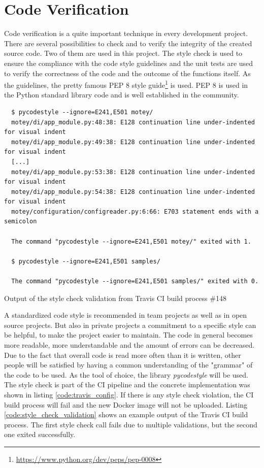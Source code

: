 \section{Code Verification}
\label{section:code-verification}
Code verification is a quite important technique in every development project.
There are several possibilities to check and to verify the integrity of the created source code.
Two of them are used in this project.
The style check is used to ensure the compliance with the code style guidelines and the unit tests are used to verify the correctness of the code and the outcome of the functions itself.
As the guidelines, the pretty famous \ac{PEP} 8 style guide\footnote{\url{https://www.python.org/dev/peps/pep-0008}} is used.
\ac{PEP} 8 is used in the Python standard library code and is well established in the community.\newline

\begin{listing}[H]
  \begin{verbatim}
  $ pycodestyle --ignore=E241,E501 motey/
  motey/di/app_module.py:48:38: E128 continuation line under-indented for visual indent
  motey/di/app_module.py:49:38: E128 continuation line under-indented for visual indent
  [...]
  motey/di/app_module.py:53:38: E128 continuation line under-indented for visual indent
  motey/di/app_module.py:54:38: E128 continuation line under-indented for visual indent
  motey/configuration/configreader.py:6:66: E703 statement ends with a semicolon

  The command "pycodestyle --ignore=E241,E501 motey/" exited with 1.

  $ pycodestyle --ignore=E241,E501 samples/

  The command "pycodestyle --ignore=E241,E501 samples/" exited with 0.
  \end{verbatim}
  \caption[Output of the style check validation from Travis CI build process \#148]{Output of the style check validation from Travis CI build process \#148\autocite{Travis:Build:148}}
  \label{code:style_check_validation}
\end{listing}

A standardized code style is recommended in team projects as well as in open source projects.
But also in private projects a commitment to a specific style can be helpful, to make the project easier to maintain.
The code in general becomes more readable, more understandable and the amount of errors can be decreased.
Due to the fact that overall code is read more often than it is written, other people will be satisfied by having a common understanding of the "grammar" of the code to be used.
As the tool of choice, the library \textit{pycodestyle} will be used.
The style check is part of the \ac{CI} pipeline and the concrete implementation was shown in listing \ref{code:travis_config}.
If there is any style check violation, the \ac{CI} build process will fail and the new Docker image will not be uploaded.
Listing \ref{code:style_check_validation} shows an example output of the Travis \ac{CI} build process.
The first style check call fails due to multiple validations, but the second one exited successfully.\newline

